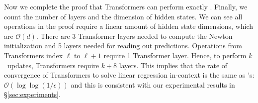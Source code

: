 Now we complete the proof that Transformers can perform exactly \newton. Finally, we count the number of layers and the dimension of hidden states. We can see all operations in the proof require a linear amount of hidden state dimensions, which are $\mathcal O(d)$. There are 3 Transformer layers needed to compute the Newton initialization and 5 layers needed for reading out predictions. Operations from Transformers index $\ell$ to $\ell+1$ require 1 Transformer layer. Hence, to perform $k$ \newton\ updates, Transformers require $k + 8$ layers. This implies that the rate of convergence of Transformers to solve linear regression in-context is the same as \newton's: $\mathcal O(\log \log (1/\epsilon))$ and this is consistent with our experimental results in \S\ref{sec:experiments}. 



